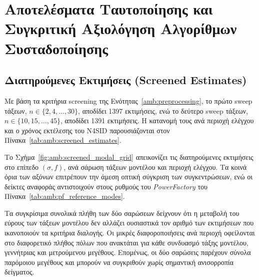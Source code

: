 \chapter{Αποτελέσματα Ταυτοποίησης και Συγκριτική Αξιολόγηση Αλγορίθμων Συσταδοποίησης}

\section{Διατηρούμενες Εκτιμήσεις (\textenglish{Screened Estimates})}

Με βάση τα κριτήρια screening της Ενότητας~\ref{amb:preprocessing}, το πρώτο sweep τάξεων, $n \in \{2,4,\dots,30\}$, αποδίδει 1397 εκτιμήσεις, ενώ το δεύτερο sweep τάξεων, $n \in \{10,15,\dots,45\}$, αποδίδει 1391 εκτιμήσεις. Η κατανομή τους ανά περιοχή ελέγχου και ο χρόνος εκτέλεσης του N4SID παρουσιάζονται στον Πίνακα~\ref{tab:amb:screened_estimates}.

\begin{table}[htbp]
    \centering
    \caption{Πλήθος διατηρούμενων εκτιμήσεων και χρόνος εκτέλεσης N4SID ανά σάρωση τάξεων μοντέλου και περιοχή ελέγχου.}
    \label{tab:amb:screened_estimates}
\end{table}

Το Σχήμα~\ref{fig:amb:screened_modal_grid} απεικονίζει τις διατηρούμενες εκτιμήσεις στο επίπεδο $(\sigma,f)$, ανά σάρωση τάξεων μοντέλου και περιοχή ελέγχου. Τα κοινά όρια των αξόνων επιτρέπουν την άμεση οπτική σύγκριση των συγκεντρώσεων, ενώ οι δείκτες αναφοράς αντιστοιχούν στους ρυθμούς του \textenglish{\textit{PowerFactory}} του Πίνακα~\ref{tab:amb:pf_reference_modes}.

Τα συγκρίσιμα συνολικά πλήθη των δύο σαρώσεων δείχνουν ότι η μεταβολή του εύρους των τάξεων μοντέλου δεν αλλάζει ουσιαστικά τον αριθμό των εκτιμήσεων που ικανοποιούν τα κριτήρια διαλογής. Οι μικρές διαφοροποιήσεις ανά περιοχή οφείλονται στο διαφορετικό πλήθος πόλων που ανακτάται για κάθε συνδυασμό τάξης μοντέλου, γεννήτριας και μετρούμενου μεγέθους. Επομένως, οι δύο σαρώσεις παρέχουν σύνολα παρόμοιου μεγέθους και μπορούν να συγκριθούν χωρίς σημαντική ανισορροπία δείγματος.

